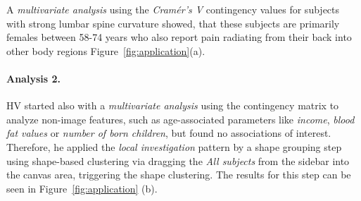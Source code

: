 \documentclass[journal]{style/vgtc} 			          %
\newcommand{\com}[1]{\textcolor{orange}{\uline{#1}}}
\begin{document}
A \emph{multivariate analysis} using the \emph{Cram\'{e}r's V} contingency values for subjects with strong lumbar spine curvature showed, that these subjects are primarily females between 58-74 years who also report pain radiating from their back into other body regions Figure~\ref{fig:application}(a).
%
%
\paragraph{Analysis 2.}
%
HV started also with a \emph{multivariate analysis} using the contingency matrix to analyze non-image features, such as age-associated parameters like \emph{income}, \emph{blood fat values} or \emph{number of born children}, but found no associations of interest.
%
Therefore, he applied the \emph{local investigation} pattern by a shape grouping step using shape-based clustering via dragging the \emph{All subjects} from the sidebar into the canvas area, triggering the shape clustering.
%
The results for this step can be seen in Figure~\ref{fig:application} (b).
\end{document}
